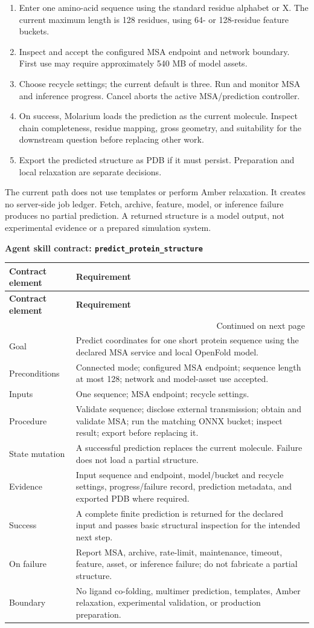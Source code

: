 \documentclass[10pt,letterpaper]{article}
\makeatletter
\newcommand{\code}[1]{\texttt{#1}}
\newenvironment{skillcontract}[1]{%
  \par\needspace{5\baselineskip}\vspace{2pt}%
  {\fontsize{10.91}{13.1}\selectfont\bfseries Agent skill contract: \code{#1}}\par\vspace{1pt}%
  \fontsize{8.4}{10}\selectfont
  \begin{longtable}{@{}K V@{}}
  \toprule
  \textbf{Contract element} & \textbf{Requirement}\\
  \midrule
  \endfirsthead
  \toprule
  \textbf{Contract element} & \textbf{Requirement}\\
  \midrule
  \endhead
  \midrule
  \multicolumn{2}{r}{\footnotesize Continued on next page}\\
  \endfoot
  \bottomrule
  \endlastfoot
}{%
  \end{longtable}
  \normalsize\fontsize{9.96}{11.95}\selectfont}
\newcommand{\contractrow}[2]{#1 & #2\\}
\makeatother
\begin{document}
\begin{enumerate}
\item Enter one amino-acid sequence using the standard residue alphabet or X. The current maximum length is 128 residues, using 64- or 128-residue feature buckets.
\item Inspect and accept the configured MSA endpoint and network boundary. First use may require approximately 540 MB of model assets.
\item Choose recycle settings; the current default is three. Run and monitor MSA and inference progress. Cancel aborts the active MSA/prediction controller.
\item On success, Molarium loads the prediction as the current molecule. Inspect chain completeness, residue mapping, gross geometry, and suitability for the downstream question before replacing other work.
\item Export the predicted structure as PDB if it must persist. Preparation and local relaxation are separate decisions.
\end{enumerate}

The current path does not use templates or perform Amber relaxation. It creates no server-side job ledger. Fetch, archive, feature, model, or inference failure produces no partial prediction. A returned structure is a model output, not experimental evidence or a prepared simulation system.

\begin{skillcontract}{predict\_protein\_structure}
\contractrow{Goal}{Predict coordinates for one short protein sequence using the declared MSA service and local OpenFold model.}
\contractrow{Preconditions}{Connected mode; configured MSA endpoint; sequence length at most 128; network and model-asset use accepted.}
\contractrow{Inputs}{One sequence; MSA endpoint; recycle settings.}
\contractrow{Procedure}{Validate sequence; disclose external transmission; obtain and validate MSA; run the matching ONNX bucket; inspect result; export before replacing it.}
\contractrow{State mutation}{A successful prediction replaces the current molecule. Failure does not load a partial structure.}
\contractrow{Evidence}{Input sequence and endpoint, model/bucket and recycle settings, progress/failure record, prediction metadata, and exported PDB where required.}
\contractrow{Success}{A complete finite prediction is returned for the declared input and passes basic structural inspection for the intended next step.}
\contractrow{On failure}{Report MSA, archive, rate-limit, maintenance, timeout, feature, asset, or inference failure; do not fabricate a partial structure.}
\contractrow{Boundary}{No ligand co-folding, multimer prediction, templates, Amber relaxation, experimental validation, or production preparation.}
\end{skillcontract}
\end{document}
